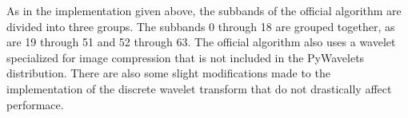 As in the implementation given above, the subbands of the official algorithm are divided into three groups.
The subbands 0 through 18 are grouped together, as are 19 through 51 and 52 through 63.
The official algorithm also uses a wavelet specialized for image compression that is not included in the PyWavelets distribution.
There are also some slight modifications made to the implementation of the discrete wavelet transform that do not drastically affect performace.

